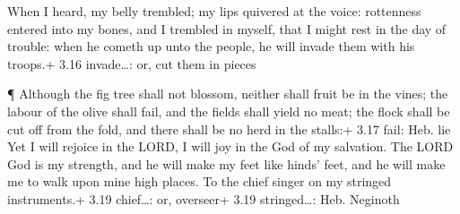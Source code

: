  When I heard, my belly trembled; my lips quivered at the
voice: rottenness entered into my bones, and I trembled in myself, that
I might rest in the day of trouble: when he cometh up unto the people,
he will invade them with his troops.+ 3.16 invade\ldots: or, cut them in
pieces

 ¶ Although the fig tree shall not blossom, neither shall
fruit be in the vines; the labour of the olive shall fail, and the
fields shall yield no meat; the flock shall be cut off from the fold,
and there shall be no herd in the stalls:+ 3.17 fail: Heb. lie
 Yet I will rejoice in the LORD, I will joy in the God of
my salvation.  The LORD God is my strength, and he will
make my feet like hinds' feet, and he will make me to walk upon mine
high places. To the chief singer on my stringed instruments.+ 3.19
chief\ldots: or, overseer+ 3.19 stringed\ldots: Heb. Neginoth
